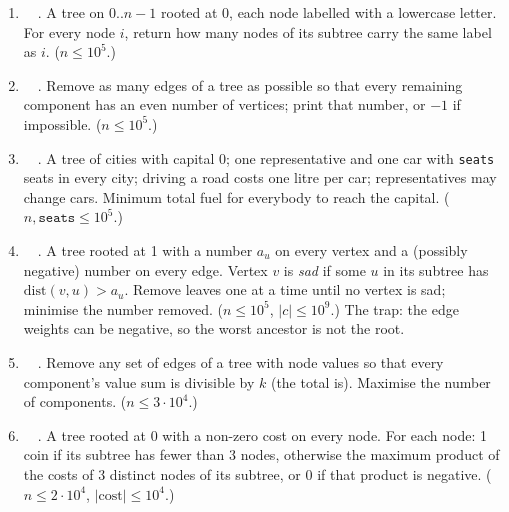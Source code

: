 \exlegend
\begin{enumerate}[leftmargin=*, label=\textbf{E2.\arabic*}, itemsep=6pt]
    \item \exeasy\ \pconcept {}\ . A tree on $0..n-1$ rooted at 0, each node labelled with a lowercase letter. For every node $i$, return how many nodes of its subtree carry the same label as $i$. ($n \le 10^5$.)
    \item \exeasy\ \pclassic {}\ . Remove as many edges of a tree as possible so that every remaining component has an even number of vertices; print that number, or $-1$ if impossible. ($n \le 10^5$.)
    \item \exmedium\ \pclassic {}\ . A tree of cities with capital 0; one representative and one car with \texttt{seats} seats in every city; driving a road costs one litre per car; representatives may change cars. Minimum total fuel for everybody to reach the capital. ($n, \texttt{seats} \le 10^5$.)
    \item \exmedium\ \ptricky {}\ . A tree rooted at 1 with a number $a_u$ on every vertex and a (possibly negative) number on every edge. Vertex $v$ is \emph{sad} if some $u$ in its subtree has $\mathrm{dist}(v, u) > a_u$. Remove leaves one at a time until no vertex is sad; minimise the number removed. ($n \le 10^5$, $|c| \le 10^9$.) The trap: the edge weights can be negative, so the worst ancestor is not the root.
    \item \exmedium\ \pconcept {}\ . Remove any set of edges of a tree with node values so that every component's value sum is divisible by $k$ (the total is). Maximise the number of components. ($n \le 3\cdot10^4$.)
    \item \exhard\ \precent {}\ . A tree rooted at 0 with a non-zero cost on every node. For each node: 1 coin if its subtree has fewer than 3 nodes, otherwise the maximum product of the costs of 3 distinct nodes of its subtree, or 0 if that product is negative. ($n \le 2\cdot10^4$, $|\mathrm{cost}| \le 10^4$.)
\end{enumerate}

